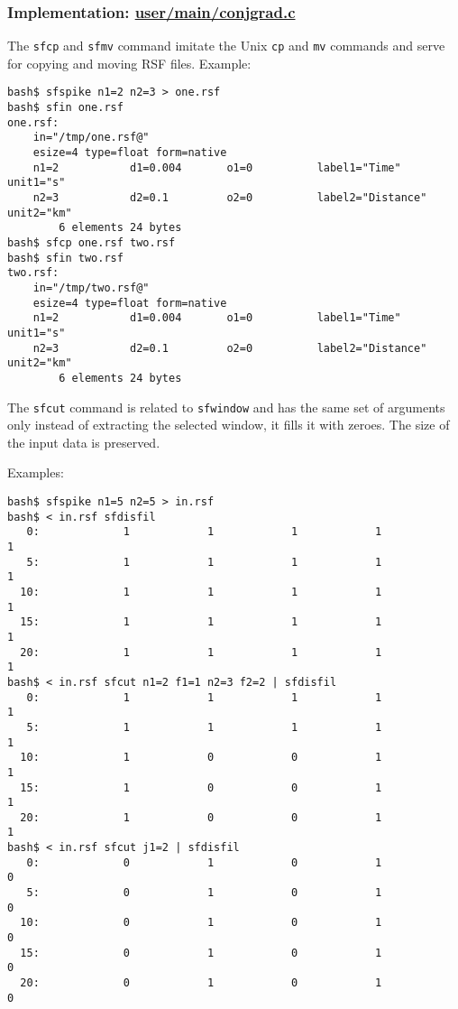 \subsubsection{Implementation: \href{http://rsf.svn.sourceforge.net/viewvc/rsf/trunk/user/main/conjgrad.c?view=markup}{user/main/conjgrad.c}}



\noindent\doublebox{\parbox{\textwidth}{

}}

The \texttt{sfcp} and \texttt{sfmv} command imitate the Unix
\texttt{cp} and \texttt{mv} commands and serve for copying and moving
RSF files. Example:
\begin{verbatim}
bash$ sfspike n1=2 n2=3 > one.rsf
bash$ sfin one.rsf
one.rsf:
    in="/tmp/one.rsf@"
    esize=4 type=float form=native
    n1=2           d1=0.004       o1=0          label1="Time" unit1="s"
    n2=3           d2=0.1         o2=0          label2="Distance" unit2="km"
        6 elements 24 bytes
bash$ sfcp one.rsf two.rsf
bash$ sfin two.rsf
two.rsf:
    in="/tmp/two.rsf@"
    esize=4 type=float form=native
    n1=2           d1=0.004       o1=0          label1="Time" unit1="s"
    n2=3           d2=0.1         o2=0          label2="Distance" unit2="km"
        6 elements 24 bytes
\end{verbatim}

\noindent\doublebox{\parbox{\textwidth}{

}}

The \texttt{sfcut} command is related to \texttt{sfwindow} and has the same
set of arguments only instead of extracting the selected window, it fills it
with zeroes. The size of the input data is preserved. 

Examples:
\begin{verbatim}
bash$ sfspike n1=5 n2=5 > in.rsf
bash$ < in.rsf sfdisfil
   0:             1            1            1            1            1
   5:             1            1            1            1            1
  10:             1            1            1            1            1
  15:             1            1            1            1            1
  20:             1            1            1            1            1
bash$ < in.rsf sfcut n1=2 f1=1 n2=3 f2=2 | sfdisfil
   0:             1            1            1            1            1
   5:             1            1            1            1            1
  10:             1            0            0            1            1
  15:             1            0            0            1            1
  20:             1            0            0            1            1
bash$ < in.rsf sfcut j1=2 | sfdisfil
   0:             0            1            0            1            0
   5:             0            1            0            1            0
  10:             0            1            0            1            0
  15:             0            1            0            1            0
  20:             0            1            0            1            0
\end{verbatim}

